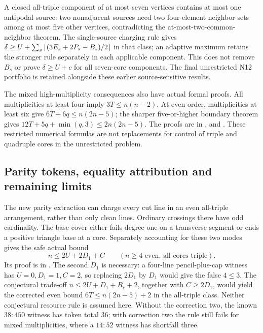 A closed all-triple component of at most seven vertices contains at most
one antipodal source: two nonadjacent sources need two four-element
neighbor sets among at most five other vertices, contradicting the
at-most-two-common-neighbor theorem. The single-source charging rule gives
$\delta\ge U+\sum_s\left\lceil(3E_s+2P_s-B_s)/2\right\rceil$ in that class; an adaptive
maximum retains the stronger rule separately in each applicable component.
This does not remove $B_s$ or prove $\delta\ge U+c$ for all seven-core
components. The final unrestricted N12 portfolio is retained alongside
these earlier source-sensitive results.

The mixed high-multiplicity consequences also have actual formal proofs.
All multiplicities at least four imply $3T\le n(n-2)$.
At even order, multiplicities at least six give
$6T+6q\le n(2n-5)$; the sharper five-or-higher boundary theorem gives
$12T+5q+\min(q,3)\le2n(2n-5)$.
The proofs are in ,
 and .
These restricted numerical formulas are not replacements for control of
triple and quadruple cores in the unrestricted problem.

\subsection{Parity tokens, equality attribution and remaining limits}
\label{upper:tokens}

The new parity extraction can charge every cut line in an even all-triple
arrangement, rather than only clean lines. Ordinary crossings there have
odd cardinality. The base cover either fails degree one on a transverse
segment or ends a positive triangle base at a core. Separately accounting
for these two modes gives the safe actual bound
\begin{equation}
 n\le2U+2D_1+C\qquad(n\ge4\text{ even, all cores triple}).
 \label{upper:all-line-parity}
\end{equation}
Its proof is in . The second $D_1$
is necessary: a four-line pencil-plus-cap witness has $U=0,D_1=1,C=2$,
so replacing $2D_1$ by $D_1$ would give the false $4\le3$.
The conjectural trade-off $n\le2U+D_1+R_c+2$, together with
$C\ge2D_1$, would yield the corrected even bound
$6T\le n(2n-5)+2$ in the all-triple class. Neither conjectural resource
rule is assumed here. Without the correction two, the known $38:450$
witness has token total 36; with correction two the rule still fails for
mixed multiplicities, where a $14:52$ witness has shortfall three.

